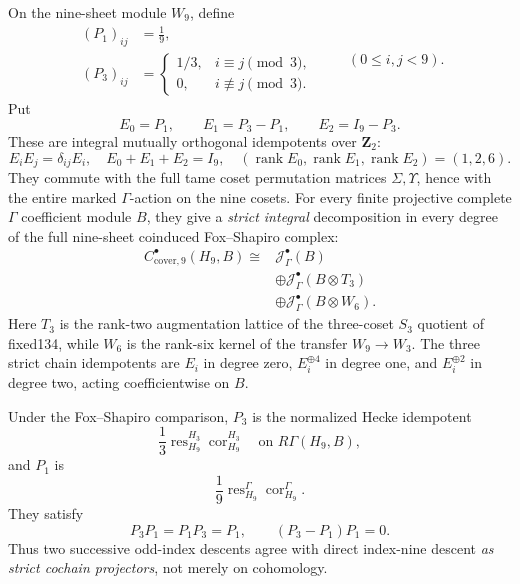 \begin{theorem}
\label{thm:dyadic-f135-nine-hecke-tower}
On the nine-sheet
module $W_9$, define
\begin{equation}\label{eq:dyadic-f135-nine-projection-data}
\begin{aligned}
(P_1)_{ij}&=\frac19,\\
(P_3)_{ij}&=
\begin{cases}
1/3,&i\equiv j\pmod3,\\
0,&i\not\equiv j\pmod3.
\end{cases}
\end{aligned}
\qquad (0\le i,j<9).
\end{equation}
Put
\begin{equation}\label{eq:dyadic-f135-nine-three-projectors}
\boxed{\quad
E_0=P_1,\qquad
E_1=P_3-P_1,\qquad
E_2=I_9-P_3.
\quad}
\end{equation}
These are integral
mutually orthogonal
idempotents over
$\mathbf Z_2$:
\begin{equation}\label{eq:dyadic-f135-nine-orthogonal}
\boxed{
E_iE_j=\delta_{ij}E_i,\quad
E_0+E_1+E_2=I_9,\quad
(\operatorname{rank}E_0,
 \operatorname{rank}E_1,
 \operatorname{rank}E_2)
=(1,2,6).
}
\end{equation}
They commute with
the full tame
coset permutation
matrices $\Sigma,\Upsilon$,
hence with
the entire
marked $\Gamma$-action
on the nine cosets.
For every finite
projective complete
$\Gamma$ coefficient
module $B$,
they give a
\emph{strict integral}
decomposition in
every degree of
the full nine-sheet
coinduced
Fox--Shapiro complex:
\begin{equation}\label{eq:dyadic-f135-nine-three-chain-summands}
\boxed{
\begin{aligned}
C^\bullet_{\mathrm{cover},9}
(H_9,B)
\cong {}&
\mathcal J_\Gamma^\bullet(B)\\
&\oplus\mathcal J_\Gamma^\bullet
(B\otimes T_3)\\
&\oplus\mathcal J_\Gamma^\bullet
(B\otimes W_6).
\end{aligned}}
\end{equation}
Here $T_3$ is the
rank-two augmentation
lattice of the
three-coset $S_3$
quotient of fixed134,
while $W_6$ is
the rank-six kernel
of the transfer
$W_9\to W_3$.
The three strict
chain idempotents are
$E_i$ in degree
zero, $E_i^{\oplus4}$
in degree one,
and $E_i^{\oplus2}$
in degree two,
acting coefficientwise
on $B$.

Under the
Fox--Shapiro comparison,
$P_3$ is the normalized
Hecke idempotent
\[
\frac13\operatorname{res}_{H_9}^{H_3}
\operatorname{cor}_{H_9}^{H_3}
\quad\text{on }R\Gamma(H_9,B),
\]
and $P_1$ is
\[
\frac19\operatorname{res}_{H_9}^{\Gamma}
\operatorname{cor}_{H_9}^{\Gamma}.
\]
They satisfy
\begin{equation}\label{eq:dyadic-f135-nested-hecke-identity}
\boxed{\quad
P_3P_1=P_1P_3=P_1,\qquad
(P_3-P_1)P_1=0.
\quad}
\end{equation}
Thus two successive
odd-index descents
agree with direct
index-nine descent
\emph{as strict
cochain projectors},
not merely
on cohomology.


\end{theorem}
